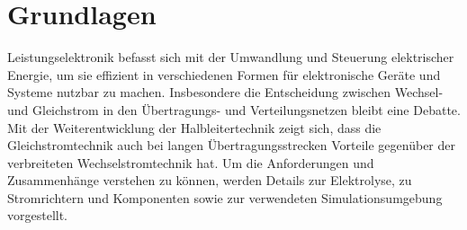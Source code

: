 \chapter{Grundlagen}
\label{sec:Grundlagen}
Leistungselektronik befasst sich mit der Umwandlung und Steuerung elektrischer Energie, um sie effizient in verschiedenen Formen für elektronische Geräte und Systeme nutzbar zu machen. Insbesondere die Entscheidung zwischen Wechsel- und Gleichstrom in den Übertragungs- und Verteilungsnetzen bleibt eine Debatte. Mit der Weiterentwicklung der Halbleitertechnik zeigt sich, dass die Gleichstromtechnik auch bei langen Übertragungsstrecken Vorteile gegenüber der verbreiteten Wechselstromtechnik hat. Um die Anforderungen und Zusammenhänge verstehen zu können, werden Details zur Elektrolyse, zu Stromrichtern und Komponenten sowie zur verwendeten Simulationsumgebung vorgestellt.
